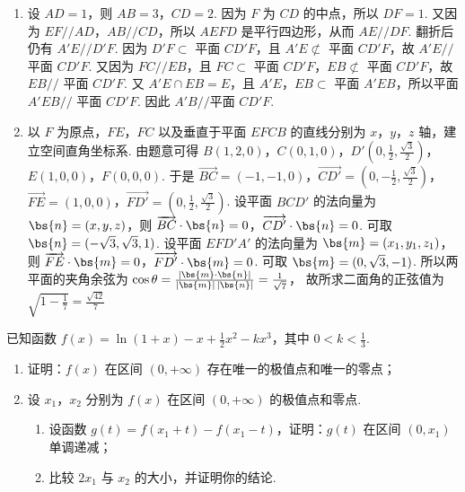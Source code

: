 \begin{solution}
\begin{enumerate}
\item 设 \(AD=1\)，则 \(AB=3\)，\(CD=2\). 因为 \(F\) 为 \(CD\) 的中点，所以 \(DF=1\). 又因为 \(EF//AD\)，\(AB//CD\)，所以 \(AEFD\) 是平行四边形，从而 \(AE//DF\). 翻折后仍有 \(A'E//D'F\).
因为 \(D'F\subset\) 平面 \(CD'F\)，且 \(A'E\not\subset\) 平面 \(CD'F\)，故 \(A'E//\) 平面 \(CD'F\). 又因为 \(FC//EB\)，且 \(FC\subset\) 平面 \(CD'F\)，\(EB\not\subset\) 平面 \(CD'F\)，故 \(EB//\) 平面 \(CD'F\).
又 \(A'E\cap EB=E\)，且 \(A'E\)，\(EB\subset\) 平面 \(A'EB\)，所以平面 \(A'EB//\) 平面 \(CD'F\). 因此
\(A'B//\text{平面 }CD'F\).

\item 以 \(F\) 为原点，\(FE\)，\(FC\) 以及垂直于平面 \(EFCB\) 的直线分别为 \(x\)，\(y\)，\(z\) 轴，建立空间直角坐标系.
由题意可得
\(B(1,2,0)\)，\(C(0,1,0)\)，\(D'\left(0,\frac12,\frac{\sqrt3}{2}\right)\)，\(E(1,0,0)\)，\(F(0,0,0)\).
于是 \(\overrightarrow{BC}=(-1,-1,0)\)，\(\overrightarrow{CD'}=\left(0,-\frac12,\frac{\sqrt3}{2}\right)\)，\(\overrightarrow{FE}=(1,0,0)\)，\(\overrightarrow{FD'}=\left(0,\frac12,\frac{\sqrt3}{2}\right)\).
设平面 \(BCD'\) 的法向量为 \(\bs{n}=(x,y,z)\)，则 \(\overrightarrow{BC}\cdot \bs{n}=0\)，\(\overrightarrow{CD'}\cdot \bs{n}=0\).
可取
\(\bs{n}=(-\sqrt3,\sqrt3,1)\).
设平面 \(EFD'A'\) 的法向量为 \(\bs{m}=(x_1,y_1,z_1)\)，则 \(\overrightarrow{FE}\cdot \bs{m}=0\)，\(\overrightarrow{FD'}\cdot \bs{m}=0\).
可取
\(\bs{m}=(0,\sqrt3,-1)\).
所以两平面的夹角余弦为
\(
\cos\theta=\frac{|\bs{m}\cdot \bs{n}|}{|\bs{m}|\,|\bs{n}|}=\frac{1}{\sqrt7}
\)，
故所求二面角的正弦值为
\(
\sqrt{1-\frac17}=\frac{\sqrt{42}}{7}
\)
\end{enumerate}
\end{solution}

\begin{problem}
已知函数 \(f(x)=\ln(1+x)-x+\frac12x^2-kx^3\)，其中 \(0<k<\frac13\).
\begin{enumerate}
\item 证明：\(f(x)\) 在区间 \((0,+\infty)\) 存在唯一的极值点和唯一的零点；
\item 设 \(x_1\)，\(x_2\) 分别为 \(f(x)\) 在区间 \((0,+\infty)\) 的极值点和零点.
    \begin{enumerate}
    \item 设函数 \(g(t)=f(x_1+t)-f(x_1-t)\)，证明：\(g(t)\) 在区间 \((0,x_1)\) 单调递减；
    \item 比较 \(2x_1\) 与 \(x_2\) 的大小，并证明你的结论.
    \end{enumerate}
\end{enumerate}
\end{problem}

